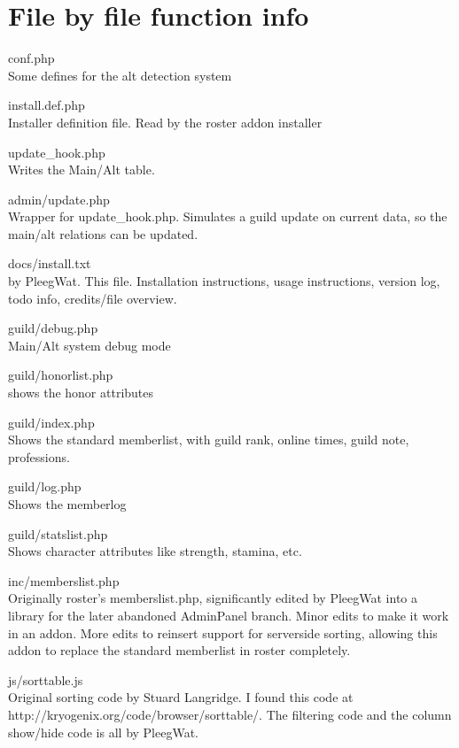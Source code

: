 \documentclass[12pt, a4paper]{article}
\begin{document}
\section{File by file function info}
\begin{description}
\item{conf.php}\\
	Some defines for the alt detection system
\item{install.def.php}\\
	Installer definition file. Read by the roster addon installer
\item{update\_hook.php}\\
	Writes the Main/Alt table.
	
\medskip
\item{admin/update.php}\\
	Wrapper for update\_hook.php. Simulates a guild update on current data,
	so the main/alt relations can be updated.

\medskip
\item{docs/install.txt}\\
	by PleegWat.
	This file. Installation instructions, usage instructions, version log,
	todo info, credits/file overview.

\medskip
\item{guild/debug.php}\\
	Main/Alt system debug mode
\item{guild/honorlist.php}\\
	shows the honor attributes
\item{guild/index.php}\\
	Shows the standard memberlist, with guild rank, online times, guild note,
	professions.
\item{guild/log.php}\\
	Shows the memberlog
\item{guild/statslist.php}\\
	Shows character attributes like strength, stamina, etc.

\medskip
\item{inc/memberslist.php}\\
	Originally roster's memberslist.php, significantly edited by PleegWat into
	a library for the later abandoned AdminPanel branch. Minor edits to make it
	work in an addon. More edits to reinsert support for serverside sorting,
	allowing this addon to replace the standard memberlist in roster
	completely.

\medskip
\item{js/sorttable.js}\\
	Original sorting code by Stuard Langridge. I found this code at
	http://kryogenix.org/code/browser/sorttable/. The filtering code and
	the column show/hide code is all by PleegWat.


\end{description}
\end{document}
